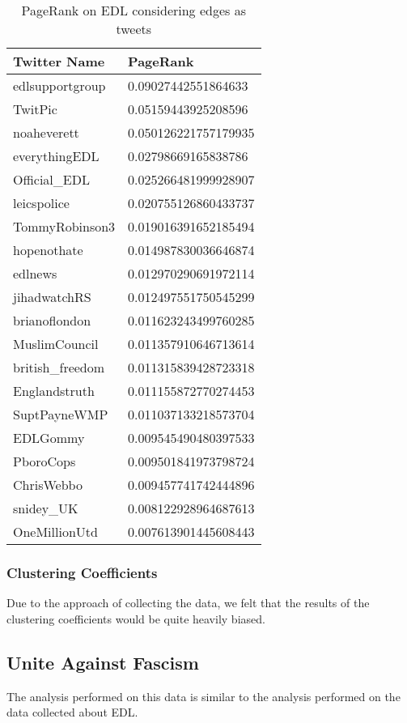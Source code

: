 \begin{table}%
\centering
\begin{tabular}{|l|l|}
\hline
Twitter Name & PageRank \\
\hline
edlsupportgroup & 0.09027442551864633 \\
TwitPic & 0.05159443925208596 \\
noaheverett & 0.050126221757179935 \\
everythingEDL & 0.02798669165838786 \\
Official\_EDL & 0.025266481999928907 \\
leicspolice & 0.020755126860433737 \\
TommyRobinson3 & 0.019016391652185494 \\
hopenothate & 0.014987830036646874 \\
edlnews & 0.012970290691972114 \\
jihadwatchRS & 0.012497551750545299 \\
brianoflondon & 0.011623243499760285 \\
MuslimCouncil & 0.011357910646713614 \\
british\_freedom & 0.011315839428723318 \\
Englandstruth & 0.011155872770274453 \\
SuptPayneWMP & 0.011037133218573704 \\
EDLGommy & 0.009545490480397533 \\
PboroCops & 0.009501841973798724 \\
ChrisWebbo & 0.009457741742444896 \\
snidey\_UK & 0.008122928964687613 \\
OneMillionUtd & 0.007613901445608443 \\
\hline
\end{tabular}
\caption{PageRank on EDL considering edges as tweets}
\label{tab:edltweetpagerank}
\end{table}

\subsubsection{Clustering Coefficients}
Due to the approach of collecting the data, we felt that the results of the clustering coefficients would be quite heavily biased. 

\subsection{Unite Against Fascism}
The analysis performed on this data is similar to the analysis performed on the data collected about EDL.

